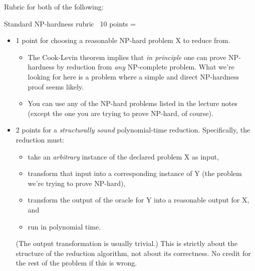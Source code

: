 \documentclass[11pt]{article}
\begin{document}

\noindent {}

Rubric for both of the following:

\begin{Rubric}{Standard NP-hardness rubric}~
10 points = 
\begin{itemize}
\item[+]
1 point for choosing a reasonable NP-hard problem X to reduce from.
\begin{itemize}\cramped
\item
The Cook-Levin theorem implies that \emph{in principle} one can prove NP-hardness by reduction from \emph{any} NP-complete problem.  What we’re looking for here is a problem where a simple and direct NP-hardness proof seems likely.
\item
You can use any of the NP-hard problems listed in the lecture notes (except the one you are trying to prove NP-hard, of course).
\end{itemize}

\item[+]
2 points for a \emph{structurally sound} polynomial-time reduction.  Specifically, the reduction must:
\begin{itemize}\cramped
\item take an \emph{arbitrary} instance of the declared problem X  as input,
\item transform that input into a corresponding instance of Y (the problem we’re trying to prove NP-hard), 
\item transform the output of the oracle for Y into a reasonable output for X, and
\item run in polynomial time.
\end{itemize}
(The output transformation is usually trivial.)  This is strictly about the structure of the reduction algorithm, not about its correctness.  No credit for the rest of the problem if this is wrong.


\end{itemize}
\end{Rubric}
\end{document}
